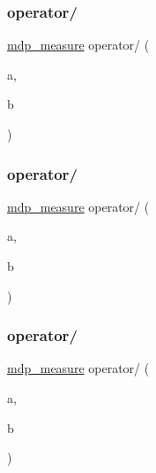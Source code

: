 \mbox{\label{classmdp__measure_a662fb1d8c18de9dc82182a67a082f24d}} 
\subsubsection{\texorpdfstring{operator/}{operator/}\hspace{0.1cm}{\footnotesize\ttfamily [1/3]}}
{\footnotesize\ttfamily \hyperlink{classmdp__measure}{mdp\+\_\+measure} operator/ (\begin{DoxyParamCaption}\item[{\hyperlink{classmdp__measure}{mdp\+\_\+measure}}]{a,  }\item[{\hyperlink{classmdp__measure}{mdp\+\_\+measure}}]{b }\end{DoxyParamCaption})\hspace{0.3cm}{\ttfamily [friend]}}

\mbox{\label{classmdp__measure_acac38148dfa66a6b1c40a18896778bbb}} 
\subsubsection{\texorpdfstring{operator/}{operator/}\hspace{0.1cm}{\footnotesize\ttfamily [2/3]}}
{\footnotesize\ttfamily \hyperlink{classmdp__measure}{mdp\+\_\+measure} operator/ (\begin{DoxyParamCaption}\item[{float}]{a,  }\item[{\hyperlink{classmdp__measure}{mdp\+\_\+measure}}]{b }\end{DoxyParamCaption})\hspace{0.3cm}{\ttfamily [friend]}}

\mbox{\label{classmdp__measure_ae62ef8561fd82d07834885f6c7569a23}} 
\subsubsection{\texorpdfstring{operator/}{operator/}\hspace{0.1cm}{\footnotesize\ttfamily [3/3]}}
{\footnotesize\ttfamily \hyperlink{classmdp__measure}{mdp\+\_\+measure} operator/ (\begin{DoxyParamCaption}\item[{\hyperlink{classmdp__measure}{mdp\+\_\+measure}}]{a,  }\item[{float}]{b }\end{DoxyParamCaption})\hspace{0.3cm}{\ttfamily [friend]}}

